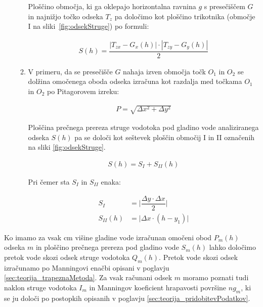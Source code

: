 \begin{enumerate}
\begin{enumerate}
	
	Ploščino območja, ki ga oklepajo horizontalna ravnina $g$ s presečiščem $G$ in najnižjo točko odseka $T_z$ pa določimo kot ploščino trikotnika (območje I na sliki~\ref{fig:odsekStruge}) po formuli:
	
	\begin{ceqn}
		\begin{align}
		S(h) = \dfrac{|T_{zx} - G_x(h)| \cdot |T_{zy} - G_y(h)|}{2}
		\end{align}
	\end{ceqn}
	
	
	\item V primeru, da se presečišče $G$ nahaja izven območja točk $O_1$ in $O_2$ se dolžina omočenega oboda odseka izračuna kot razdalja med točkama $O_1$ in $O_2$ po Pitagorovem izreku:
	
	\begin{ceqn}
		\begin{align}
		P = \sqrt{ \Delta x^{2} + \Delta y^{2}}
		\end{align}
	\end{ceqn}
	
	Ploščina prečnega prereza struge vodotoka pod gladino vode analiziranega odseka $S(h)$ pa se določi kot seštevek ploščin območij I in II označenih na sliki \ref{fig:odsekStruge}.
	
	\begin{ceqn}
		\begin{align}
		S(h) = S_I + S_{II}(h)
		\end{align}
	\end{ceqn}
	
	Pri čemer sta $S_I$ in $S_{II}$ enaka:
	
		\begin{ceqn}
			\begin{align}
			S_I&= \bigg|\dfrac{ \Delta y \cdot  \Delta x}{2}\bigg|\\
			S_{II}(h)&= \bigg|\Delta x \cdot (h - y_1)\bigg|
			\end{align}
		\end{ceqn}
		
			
		
	\end{enumerate}

\end{enumerate}



Ko imamo za vsak cm višine gladine vode izračunan omočeni obod $P_m(h)$ odseka $m$ in ploščino prečnega prereza pod gladino vode $S_m(h)$ lahko določimo pretok vode skozi odsek struge vodotoka $Q_m(h)$. Pretok vode skozi odsek izračunamo po Manningovi enačbi opisani v poglavju \ref{sec:teorija_trapeznaMetoda}. Za vsak računani odsek $m$ moramo poznati tudi naklon struge vodotoka $I_m$ in  Manningov koeficient hrapavosti površine $ng_m$, ki se ju določi po postopkih opisanih v poglavju \ref{sec:teorija_pridobitevPodatkov}.


